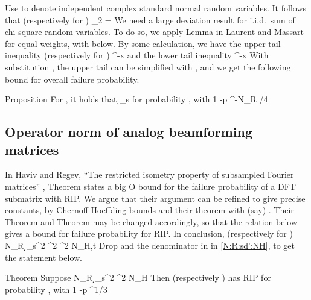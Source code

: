 Use  to denote independent complex standard normal random variables.
It follows that (respectively for )
%
 {
 _2
= 
}
%
We need a large deviation result for i.i.d.\ sum of chi-square random variables.
To do so, we apply Lemma  in Laurent and Massart \cite {LaM00} for equal weights, with  below.
By some calculation, we have the upper tail inequality (respectively for )
%
 {
 
\leq {} ^{-x} 
}
%
and the lower tail inequality
%
 {
 
\leq {} ^{-x} 
}
%
With substitution , the upper tail can be simplified with , and we get the following bound for overall failure probability.

\Result
{Proposition}
{
For , it holds that
%
 {
\geq \d_s 
}
for probability , with
 {
1 -p
  ^{-N_R  /4} 
}
}

\subsection {Operator norm of analog beamforming matrices}

In Haviv and Regev, ``The restricted isometry property of subsampled Fourier matrices'' \cite {KlM17}, Theorem  states a big O bound for the failure probability of a DFT submatrix with  RIP.
We argue that their argument can be refined to give precise constants, by Chernoff-Hoeffding bounds and their theorem  with (say) .
Their Theorem  and Theorem  may be changed accordingly, so that the relation below gives a bound for failure probability for  RIP.
In conclusion, (respectively for )
%
 {
N_R
\geq {} {\d_s^2} ^2 ^2 \log N_{H,t}
}
%
Drop  and the denominator  in  in \eqref {N:R:sd':NH}, to get the statement below.

\Result
{Theorem}
{
Suppose
%
 {
N_R
\geq {} {\d_s^2} ^2 \log N_H 
}
%
Then  (respectively ) has  RIP for probability , with
 {
1 -p
\leq {} ^{1/3} 
}
}



